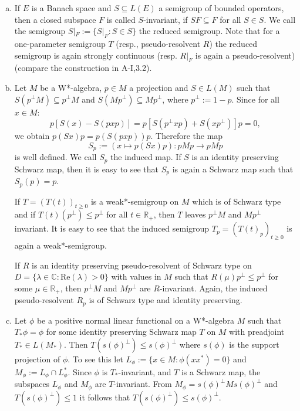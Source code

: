 \begin{enumerate}[(a)]
\item
If $ E $ is a Banach space and $ S \subseteq L(E) $ a semigroup of bounded operators, then a closed subspace $ F $ is called $ S $-invariant, if $ SF \subseteq F $ for all $ S \in S $.
We call the semigroup $ S|_F := \{S|_F : S \in S \} $ the reduced semigroup.
Note that for a one-parameter semigroup $ T $ (resp., pseudo-resolvent $ R $) the reduced semigroup is again strongly continuous (resp. $ R|_F $ is again a pseudo-resolvent) (compare the construction in A-I,3.2).

\item
Let $ M $ be a W*-algebra, $ p \in M $ a projection and $ S \in L(M) $ such that $ S(p^{\perp}M) \subseteq p^{\perp}M $ and $ S(Mp^{\perp}) \subseteq Mp^{\perp} $, where $ p^{\perp} := 1-p $.
Since for all $ x \in M $:
\[
p[S(x) - S(pxp)] = p[S(p^{\perp}xp) + S(xp^{\perp})]p = 0,
\]
we obtain $ p(Sx)p = p(S(pxp))p $.
Therefore the map
\[
S_p := (x \mapsto p(Sx)p) : pMp \to pMp
\]
is well defined.
We call $ S_p $ the induced map.
If $ S $ is an identity preserving Schwarz map, then it is easy to see that $ S_p $ is again a Schwarz map such that $ S_p(p) = p $.

If $ T = (T(t))_{t\geq0} $ is a weak*-semigroup on $ M $ which is of Schwarz type and if $ T(t)(p^{\perp}) \leq p^{\perp} $ for all $ t \in \mathbb{R}_+ $, then $ T $ leaves $ p^{\perp}M $ and $ Mp^{\perp} $ invariant.
It is easy to see that the induced semigroup $ T_p = (T(t)_p)_{t\geq0} $ is again a weak*-semigroup.

If $ R $ is an identity preserving pseudo-resolvent of Schwarz type on $ D = \{\lambda \in \mathbb{C} : \text{Re}(\lambda) > 0\} $ with values in $ M $ such that $ R(\mu)p^{\perp} \leq p^{\perp} $ for some $ \mu \in \mathbb{R}_+ $, then $ p^{\perp}M $ and $ Mp^{\perp} $ are $ R $-invariant.
Again, the induced pseudo-resolvent $ R_p $ is of Schwarz type and identity preserving.

\item
Let $ \phi $ be a positive normal linear functional on a W*-algebra $ M $ such that $ T_*\phi = \phi $ for some identity preserving Schwarz map $ T $ on $ M $ with preadjoint $ T_* \in L(M_*) $.
Then $ T(s(\phi)^{\perp}) \leq s(\phi)^{\perp} $ where $ s(\phi) $ is the support projection of $ \phi $.
To see this let $ L_{\phi} := \{x \in M: \phi(xx^*) = 0\} $ and $ M_{\phi} := L_{\phi} \cap L_{\phi}^* $.
Since $ \phi $ is $ T_* $-invariant, and $ T $ is a Schwarz map, the subspaces $ L_{\phi} $ and $ M_{\phi} $ are $ T $-invariant.
From $ M_{\phi} = s(\phi)^{\perp}Ms(\phi)^{\perp} $ and $ T(s(\phi)^{\perp}) \leq 1 $ it follows that $ T(s(\phi)^{\perp}) \leq s(\phi)^{\perp} $.


\end{enumerate}
